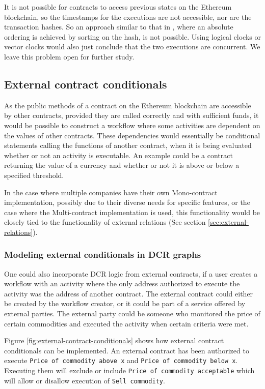 \documentclass{article}
\begin{document}
			It is not possible for contracts to access previous states on the Ethereum blockchain, so the timestamps for the executions are not accessible, nor are the transaction hashes. 
			So an approach similar to that in \cite{bachelor}, where an absolute ordering is achieved by sorting on the hash, is not possible.
			Using logical clocks or vector clocks would also just conclude that the two executions are concurrent.
			We leave this problem open for further study.

		\subsection{External contract conditionals}
		\label{subsec:external-contract-conditionals}
		As the public methods of a contract on the Ethereum blockchain are accessible by other contracts, provided they are called correctly and with sufficient funds, it would be possible to construct a workflow where some activities are dependent on the values of other contracts.
		These dependencies would essentially be conditional statements calling the functions of another contract, when it is being evaluated whether or not an activity is executable. 
		An example could be a contract returning the value of a currency and whether or not it is above or below a specified threshold.

		In the case where multiple companies have their own Mono-contract implementation, possibly due to their diverse needs for specific features, or the case where the Multi-contract implementation is used, this functionality would be closely tied to the functionality of external relations (See section \ref{sec:external-relations}).

			\subsubsection{Modeling external conditionals in DCR graphs}
			One could also incorporate DCR logic from external contracts, if a user creates a workflow with an activity where the only address authorized to execute the activity was the address of another contract.
			The external contract could either be created by the workflow creator, or it could be part of a service offered by external parties.
			The external party could be someone who monitored the price of certain commodities and executed the activity when certain criteria were met.
			
			Figure \ref{fig:external-contract-conditionals} shows how external contract conditionals can be implemented. 
			An external contract has been authorized to execute \texttt{Price of commodity above x} and \texttt{Price of commodity below x}. 
			Executing them will exclude or include \texttt{Price of commodity acceptable} which will allow or disallow execution of \texttt{Sell commodity}.
			
\end{document}
